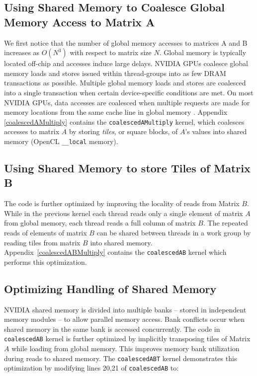 \documentclass[review=false, sigchi]{acmart}
\begin{document}
	\subsection{Using Shared Memory to Coalesce Global Memory Access to Matrix A} 
	
	We first notice that the number of global memory accesses to matrices A and B increases as $O(N^3)$ with respect to matrix size $N$.
	Global memory is typically located off-chip and accesses induce large delays.
	NVIDIA GPUs coalesce global memory loads and stores issued within thread-groups into as few DRAM transactions as possible.
	Multiple global memory loads and stores are coalesced into a single transaction when certain device-specific conditions are met. 
	On most NVIDIA GPUs, data accesses are coalesced when multiple requests are made for memory locations from the same cache line in global memory \cite{cudamanual}. Appendix \ref{coalescedAMultiply} contains the \texttt{coalescedAMultiply} kernel, which coalesces accesses to matrix $A$ by storing \emph{tiles}, or square blocks, of $A$'s values into shared memory (OpenCL \texttt{\_\_local} memory). 
	
	
	\subsection{Using Shared Memory to store Tiles of Matrix B} 
	
	The code is further optimized by improving the locality of reads from Matrix $B$.
	While in the previous kernel each thread reads only a single element of matrix $A$ from global memory, each thread reads a full column of matrix $B$.
	The repeated reads of elements of matrix $B$ can be shared between threads in a work group by reading tiles from matrix $B$ into shared memory.
	Appendix~\ref{coalescedABMultiply} contains the \texttt{coalescedAB} kernel which performs this optimization.
	
	\subsection{Optimizing Handling of Shared Memory} 
	
	NVIDIA shared memory is divided into multiple banks -- stored in independent memory modules -- to allow parallel memory access.
	Bank conflicts occur when shared memory in the same bank is accessed concurrently.
	The code in \texttt{coalescedAB} kernel is further optimized by implicitly transposing tiles of Matrix $A$ while loading from global memory. This improves memory bank utilization during reads to shared memory. The \texttt{coalescedABT} kernel demonstrates this optimization by modifying lines 20,21 of \texttt{coalescedAB} to:
	
\end{document}
